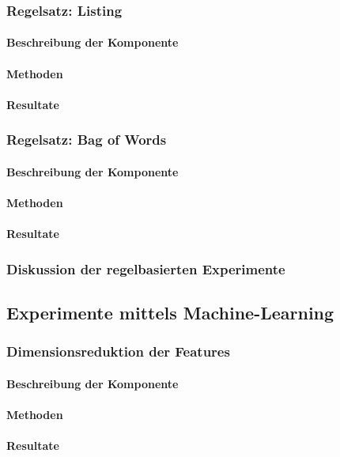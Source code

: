 \subsubsection{Regelsatz: Listing}
\paragraph{Beschreibung der Komponente}
\paragraph{Methoden}
\paragraph{Resultate}
\subsubsection{Regelsatz: Bag of Words}
\paragraph{Beschreibung der Komponente}
\paragraph{Methoden}
\paragraph{Resultate}
\subsubsection{Diskussion der regelbasierten Experimente}
\subsection{Experimente mittels Machine-Learning}
\subsubsection{Dimensionsreduktion der Features}
\paragraph{Beschreibung der Komponente}
\paragraph{Methoden}
\paragraph{Resultate}
